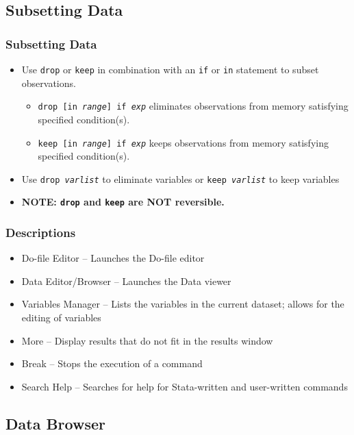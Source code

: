 \documentclass{beamer}
\begin{document}
\subsection{Subsetting Data}

\begin{frame}
	\frametitle{Subsetting Data}
		\begin{itemize}
			\item Use \texttt{drop} or \texttt{keep} in combination with an \texttt{if} or \texttt{in} statement to subset observations.
				\begin{itemize}
					\item \texttt{drop [in \textit{range}] if \textit{exp}} eliminates observations from memory satisfying specified condition(s).
					\item \texttt{keep [in \textit{range}] if \textit{exp}} keeps observations from memory satisfying specified condition(s).
				\end{itemize}
			\item Use \texttt{drop \textit{varlist}} to eliminate variables or \texttt{keep \textit{varlist}} to keep variables
			\item \textbf{NOTE: \texttt{drop} and \texttt{keep} are NOT reversible.}
		\end{itemize}
\end{frame}

\begin{frame}
	\frametitle{Descriptions}
		\begin{itemize}
			\item Do-file Editor -- Launches the Do-file editor
			\item Data Editor/Browser -- Launches the Data viewer
			\item Variables Manager -- Lists the variables in the current dataset; allows for the editing of variables
			\item More -- Display results that do not fit in the results window
			\item Break -- Stops the execution of a command
			\item Search Help -- Searches for help for Stata-written and user-written commands
		\end{itemize}
\end{frame}

\subsection{Data Browser}
\end{document}
